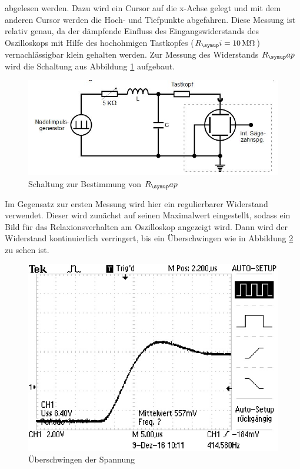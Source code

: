 abgelesen werden. Dazu wird ein Cursor auf die x-Achse gelegt und mit dem anderen Cursor
werden die Hoch- und Tiefpunkte abgefahren. Diese Messung ist relativ genau, da
der dämpfende Einfluss
des Eingangswiderstands des Oszilloskops mit Hilfe des hochohmigen Tastkopfes
($R_\su{i}=10\,\si{\mega\ohm}$) vernachlässigbar klein gehalten werden.
Zur Messung des Widerstands $R_\su{ap}$ wird die Schaltung aus Abbildung
\ref{fig:rapschlt} aufgebaut. \\
\begin{figure}[h]
  \centering
  \includegraphics[width=\textwidth]{Bilder/RapSchalt.JPG}
  \caption{Schaltung zur Bestimmung von $R_\su{ap}$\,\cite{354}}
  \label{fig:rapschlt}
\end{figure}
Im Gegensatz zur ersten Messung wird hier ein regulierbarer Widerstand verwendet.
Dieser wird zunächst auf seinen Maximalwert eingestellt, sodass ein Bild
für das Relaxionsverhalten am Oszilloskop angezeigt wird. Dann wird der
Widerstand kontinuierlich verringert, bis ein Überschwingen wie in
Abbildung \ref{fig:aperid} zu sehen ist.
\begin{figure}[h]
  \centering
  \includegraphics{Bilder/aperid.JPG}
  \caption{Überschwingen der Spannung}
  \label{fig:aperid}
\end{figure} \\
